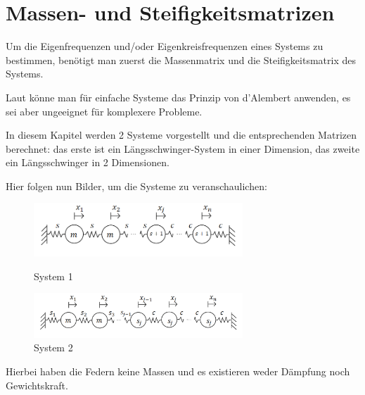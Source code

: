 \documentclass[a4paper,12pt]{report}
\newcommand{\1}{\mathds{1}}
\theoremstyle{plain} %
\theoremstyle{definition} %
\theoremstyle{remark}
\begin{document}
\chapter{Massen- und Steifigkeitsmatrizen}
\label{sec: MS Matrizen}
      Um die Eigenfrequenzen und/oder Eigenkreisfrequenzen \w eines Systems zu bestimmen, benötigt man zuerst die Massenmatrix \M und die Steifigkeitsmatrix \K des Systems.

      Laut \cite[S. 366]{maschinendynamikDresig} könne man für einfache Systeme das Prinzip von d'Alembert anwenden, es sei aber ungeeignet für komplexere Probleme.
            
      In diesem Kapitel werden 2 Systeme vorgestellt und die entsprechenden Matrizen berechnet:
      das erste ist ein Längsschwinger-System in einer Dimension, das zweite ein Längsschwinger in 2 Dimensionen.


      Hier folgen nun Bilder, um die Systeme zu veranschaulichen:

      \begin{figure}[ht]
            \centering
            \begin{minipage}[ht]{0.49\linewidth}
                  \centering
                  \includegraphics[width=0.7\textwidth, keepaspectratio]{./System1.png}
                  \caption{System 1}
                  \label{fig: System 1}
            \end{minipage}
            \hfill
            \begin{minipage}[ht]{0.49\linewidth}
                  \centering
                  \includegraphics[width=0.7\textwidth, keepaspectratio]{./System2.png}
                  \caption{System 2}
                  \label{fig: System 2}
            \end{minipage}
      \end{figure}

      Hierbei haben die Federn keine Massen und es existieren weder Dämpfung noch Gewichtskraft.
\end{document}
